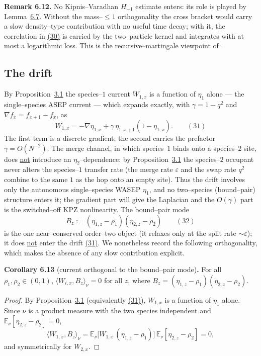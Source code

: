 \documentclass[11pt]{article}
\theoremstyle{plain}
\theoremstyle{definition}
\theoremstyle{remark}
\newcommand{\E}{\mathbb{E}}\newcommand{\PP}{\mathbb{P}}\newcommand{\dd}{\,\mathrm{d}}
\newcommand{\ip}[2]{\langle #1,#2\rangle_\nu}\newcommand{\bone}{\mathbf 1}
\newcommand{\eps}{\varepsilon}\newcommand{\Exp}{\mathrm{Exp}}
\begin{document}
\label{rem_noH}\noindent\textbf{Remark 6.12.} 
No Kipnis--Varadhan $H_{-1}$ estimate enters: its role is played by
Lemma~\hyperref[lem_orth]{6.7}. Without the mass--$\le1$ orthogonality the cross bracket would
carry a slow density--type contribution with no useful time decay; with it, the
correlation in \hyperref[eq_Ctheta]{(30)} is carried by the two--particle kernel and
integrates with at most a logarithmic loss. This is the recursive--martingale
viewpoint of \cite{ACR2}.
\par

\subsection{The drift}
By Proposition~\hyperref[prop_decouple]{3.1} the species--$1$ current $W_{1,x}$ is a function of
$\eta_1$ alone --- the single--species ASEP current --- which expands exactly, with
$\gamma=1-q^2$ and $\nabla f_x=f_{x+1}-f_x$, as
\label{eq_Wgrad}
\begin{equation}
  W_{1,x}=-\nabla\eta_{1,x}+\gamma\,\eta_{1,x+1}(1-\eta_{1,x}).\qquad(31)
\end{equation}
The first term is a discrete gradient; the second carries the prefactor
$\gamma=O(N^{-2})$. The merge channel, in which species~$1$ binds onto a species--$2$
site, does \underline{not} introduce an $\eta_2$--dependence: by
Proposition~\hyperref[prop_decouple]{3.1} the species--$2$ occupant never alters the species--$1$
transfer rate (the merge rate $\eps$ and the swap rate $q^2$ combine to the same $1$ as
the hop onto an empty site). Thus the drift involves only the autonomous single--species
WASEP $\eta_1$, and no two--species (bound--pair) structure enters it; the gradient part
will give the Laplacian and the $O(\gamma)$ part is the switched--off KPZ nonlinearity.
The bound--pair mode
\label{eq_Bdef}
\begin{equation}
  B_z:=(\eta_{1,z}-\rho_1)(\eta_{2,z}-\rho_2)\qquad(32)
\end{equation}
is the one near--conserved order--two object (it relaxes only at the split rate
$\sim\eps$); it does \underline{not} enter the drift \hyperref[eq_Wgrad]{(31)}. We nonetheless record
the following orthogonality, which makes the absence of any slow contribution explicit.

\label{prop_sym}\noindent\textbf{Corollary 6.13} (current orthogonal to the bound--pair mode)\textbf{.} 
For all $\rho_1,\rho_2\in(0,1)$, $\ip{W_{i,x}}{B_z}=0$ for all $z$, where
$B_z=(\eta_{1,z}-\rho_1)(\eta_{2,z}-\rho_2)$.
\par
\begin{proof}
By Proposition~\hyperref[prop_decouple]{3.1} (equivalently \hyperref[eq_Wgrad]{(31)}), $W_{1,x}$ is a
function of $\eta_1$ alone. Since $\nu$ is a product measure with the two species
independent and $\E_\nu[\eta_{2,z}-\rho_2]=0$,
\[
  \ip{W_{1,x}}{B_z}=\E_\nu\big[W_{1,x}\,(\eta_{1,z}-\rho_1)\big]\,\E_\nu[\eta_{2,z}-\rho_2]=0,
\]
and symmetrically for $W_{2,x}$.
\end{proof}
\end{document}
